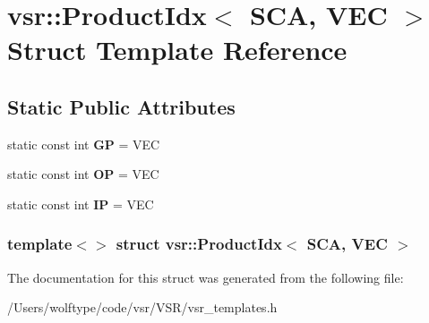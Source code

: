 \hypertarget{structvsr_1_1_product_idx_3_01_s_c_a_00_01_v_e_c_01_4}{\section{vsr\-:\-:Product\-Idx$<$ S\-C\-A, V\-E\-C $>$ Struct Template Reference}
\label{structvsr_1_1_product_idx_3_01_s_c_a_00_01_v_e_c_01_4}
}
\subsection*{Static Public Attributes}
\begin{DoxyCompactItemize}
\item 
\hypertarget{structvsr_1_1_product_idx_3_01_s_c_a_00_01_v_e_c_01_4_ac5b50871d529a258a6011963a0b3c6e5}{static const int {\bfseries G\-P} = V\-E\-C}\label{structvsr_1_1_product_idx_3_01_s_c_a_00_01_v_e_c_01_4_ac5b50871d529a258a6011963a0b3c6e5}

\item 
\hypertarget{structvsr_1_1_product_idx_3_01_s_c_a_00_01_v_e_c_01_4_a8bc16d5f9f571ecbf8425b1ad562f673}{static const int {\bfseries O\-P} = V\-E\-C}\label{structvsr_1_1_product_idx_3_01_s_c_a_00_01_v_e_c_01_4_a8bc16d5f9f571ecbf8425b1ad562f673}

\item 
\hypertarget{structvsr_1_1_product_idx_3_01_s_c_a_00_01_v_e_c_01_4_af5a69349795836e51e778d5f7e106378}{static const int {\bfseries I\-P} = V\-E\-C}\label{structvsr_1_1_product_idx_3_01_s_c_a_00_01_v_e_c_01_4_af5a69349795836e51e778d5f7e106378}

\end{DoxyCompactItemize}
\subsubsection*{template$<$$>$ struct vsr\-::\-Product\-Idx$<$ S\-C\-A, V\-E\-C $>$}



The documentation for this struct was generated from the following file\-:\begin{DoxyCompactItemize}
\item 
/\-Users/wolftype/code/vsr/\-V\-S\-R/vsr\-\_\-templates.\-h\end{DoxyCompactItemize}

